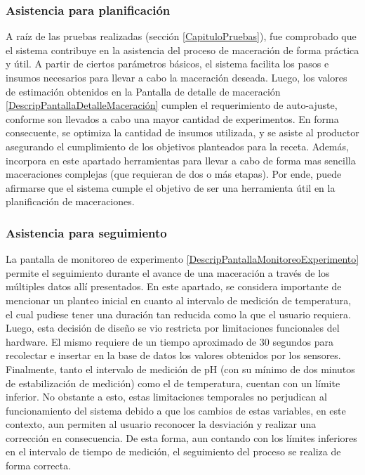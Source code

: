 \subsubsection{Asistencia para planificación} 
\par A raíz de las pruebas realizadas (sección \ref{CapituloPruebas}), fue comprobado que el sistema contribuye en la asistencia del proceso de maceración de forma práctica y útil. A partir de ciertos parámetros básicos, el sistema facilita los pasos e insumos necesarios para llevar a cabo la maceración deseada. Luego, los valores de estimación obtenidos en la Pantalla de detalle de maceración \ref{DescripPantallaDetalleMaceración} cumplen el requerimiento de auto-ajuste, conforme son llevados a cabo una mayor cantidad de experimentos. En forma consecuente, se optimiza la cantidad de insumos utilizada, y se asiste al productor asegurando el cumplimiento de los objetivos planteados para la receta. Además, incorpora en este apartado herramientas para llevar a cabo de forma mas sencilla maceraciones complejas (que requieran de dos o más etapas). Por ende, puede afirmarse que el sistema cumple el objetivo de ser una herramienta útil en la planificación de maceraciones.

\subsubsection{Asistencia para seguimiento}
\par La pantalla de monitoreo de experimento \ref{DescripPantallaMonitoreoExperimento} permite el seguimiento durante el avance de una maceración a través de los múltiples datos allí presentados. En este apartado, se considera importante de mencionar un planteo inicial en cuanto al intervalo de medición de temperatura, el cual pudiese tener una duración tan reducida como la que el usuario requiera. Luego, esta decisión de diseño se vio restricta por limitaciones funcionales del hardware. El mismo requiere de un tiempo aproximado de 30 segundos para recolectar e insertar en la base de datos los valores obtenidos por los sensores. Finalmente, tanto el intervalo de medición de pH (con su mínimo de dos minutos de estabilización de medición) como el de temperatura, cuentan con un límite inferior. No obstante a esto, estas limitaciones temporales no perjudican al funcionamiento del sistema debido a que los cambios de estas variables, en este contexto, aun permiten al usuario reconocer la desviación y realizar una corrección en consecuencia. De esta forma, aun contando con los límites inferiores en el intervalo de tiempo de medición, el seguimiento del proceso se realiza de forma correcta.

